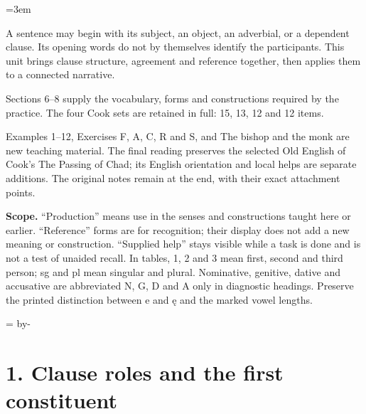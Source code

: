 \BookRecto
\begingroup
\renewcommand{\runningtitle}{Unit 13. Clause order and reference}
\emergencystretch=3em
\newcommand{\itempara}[2]{\par\addvspace{3pt}\noindent\hangindent=1.8em\hangafter=1\makebox[1.8em][l]{#1.}#2\par}
\newcommand{\reserve}[1]{\par\penalty-100\begingroup\dimen0=\pagegoal\advance\dimen0 by-\pagetotal\ifdim\dimen0<#1\newpage\fi\endgroup}

\raggedright
{}

A sentence may begin with its subject, an object, an adverbial, or a dependent clause. Its opening words do not by themselves identify the participants. This unit brings clause structure, agreement and reference together, then applies them to a connected narrative.

Sections 6–8 supply the vocabulary, forms and constructions required by the practice. The four Cook sets are retained in full: 15, 13, 12 and 12 items.

Examples 1–12, Exercises F, A, C, R and S, and The bishop and the monk are new teaching material. The final reading preserves the selected Old English of Cook’s The Passing of Chad; its English orientation and local helps are separate additions. The original notes remain at the end, with their exact attachment points.

\textbf{Scope.} “Production” means use in the senses and constructions taught here or earlier. “Reference” forms are for recognition; their display does not add a new meaning or construction. “Supplied help” stays visible while a task is done and is not a test of unaided recall. In tables, 1, 2 and 3 mean first, second and third person; sg and pl mean singular and plural. Nominative, genitive, dative and accusative are abbreviated N, G, D and A only in diagnostic headings. Preserve the printed distinction between e and ę and the marked vowel lengths.

\reserve{7\baselineskip}
\section*{1. Clause roles and the first constituent}

